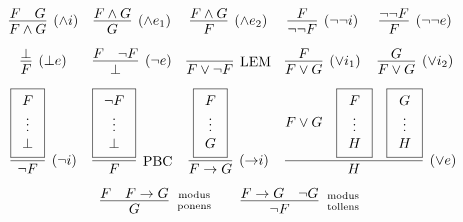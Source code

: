 \begin{table}[hbt]
    \begin{gather*}
    \begin{array}{ccccc}
    \infer[(\land i)]{F\land G}{F & G}
    &
    \infer[(\land e_1)]{G}{F \land G}
    &
    \infer[(\land e_2)]{F}{F \land G}
    &
    \infer[(\lnot\lnot i)]{\lnot\lnot F}{F}
    &
    \infer[(\lnot\lnot e)]{F}{\lnot\lnot F}
    \\[0.7em]
    \infer[(\bot e)]{F}{\bot}
    &
    \infer[(\lnot e)]{\bot}{F & \lnot F}
    &
    \infer[\text{LEM}]{F\lor\lnot F}{}
    &
    \infer[(\lor i_1)]{F\lor G}{F}
    &
    \infer[(\lor i_2)]{F\lor G}{G}
    \\[0.7em]
    \infer[(\lnot i)]{\lnot F}{
        \boxed{\begin{array}{c}F \\ \vdots \\ \bot \end{array}}}
    &
    \infer[\text{PBC}]{F}{
        \boxed{\begin{array}{c}\lnot F \\ \vdots \\ \bot \end{array}}}
    &
    \infer[({\limp} i)]{F\limp G}{
        \boxed{\begin{array}{c}F \\ \vdots \\ G \end{array}
    }}
    &
    \multicolumn{2}{l}{
        \infer[(\lor e)]{H}{
            F\lor G &
            \boxed{\begin{array}{c}F \\ \vdots \\ H \end{array}} &
            \boxed{\begin{array}{c}G \\ \vdots \\ H \end{array}}
        }
    }
    \\[0.7em]
    &
    \multicolumn{3}{r}{
    \infer[\text{modus}\atop\text{ponens}]{G}{F & F\limp G}
    \qquad
    \infer[\text{modus}\atop\text{tollens}]{\lnot F}{F\limp G & \lnot G}
    }
    &
    \end{array}
    \end{gather*}
    \caption{Natural Deduction Rules for Connectives}\label{tab:natural:deduction:connectives}
    \end{table}